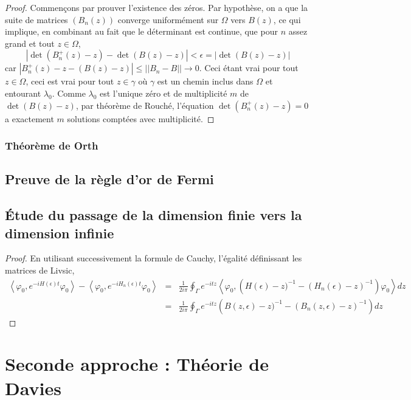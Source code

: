 \documentclass[12pt,openany,a4paper, titlepage]{article}
\newcommand{\f}[2]{\frac{#1}{#2}}
\newcommand{\lp}{\left(}
\newcommand{\rp}{\right)}
\newcommand{\la}{\left\langle}
\newcommand{\ra}{\right\rangle}
\theoremstyle{definition}
\theoremstyle{definition}
\theoremstyle{definition}
\theoremstyle{definition}
\theoremstyle{definition}
\theoremstyle{definition}
\begin{document}
\begin{proof}
Commençons par prouver l'existence des zéros. Par hypothèse, on a que la suite de matrices $(B_n(z))$ converge uniformément sur $\Omega$ vers $B(z)$, ce qui implique, en combinant au fait que le déterminant est continue, que pour $n$ assez grand et tout $z\in\Omega$, $$ |\det (B_n^+(z) - z) - \det (B(z) - z)| < \epsilon = |\det (B(z) - z)| $$ car $|B_n^+(z) - z - (B(z) - z)| \leq ||B_n - B|| \rightarrow 0$. Ceci étant vrai pour tout $z\in\Omega$, ceci est vrai pour tout $z\in\gamma$ où $\gamma$ est un chemin inclus dans $\Omega$ et entourant $\lambda_0$. Comme $\lambda_0$ est l'unique zéro et de multiplicité $m$ de $\det (B(z) - z)$, par théorème de Rouché, l'équation $\det(B_n^+(z) -z) = 0$ a exactement $m$ solutions comptées avec multiplicité.

\end{proof}

\newpage

\subsubsection{Théorème de Orth}

\subsection{Preuve de la règle d'or de Fermi}


\subsection{Étude du passage de la dimension finie vers la dimension infinie}

\begin{proof}
En utilisant successivement la formule de Cauchy, l'égalité définissant les matrices de Livsic, 
\begin{eqnarray*}
\la \varphi_0,e^{-iH(\epsilon)t}\varphi_0 \ra - \la\varphi_0,e^{-iH_n(\epsilon)t}\varphi_0 \ra &=& \f{1}{2i\pi}\oint_\Gamma e^{-itz}\la \varphi_0,\lp H(\epsilon) -z)^{-1} - (H_n(\epsilon)-z)^{-1} \rp \varphi_0 \ra dz\\
&=& \f{1}{2i\pi}\oint_\Gamma e^{-itz} \lp B(z,\epsilon) -z)^{-1} - (B_n(z,\epsilon)-z)^{-1} \rp dz
\end{eqnarray*}
\end{proof}

\section{Seconde approche : Théorie de Davies}
\end{document}
